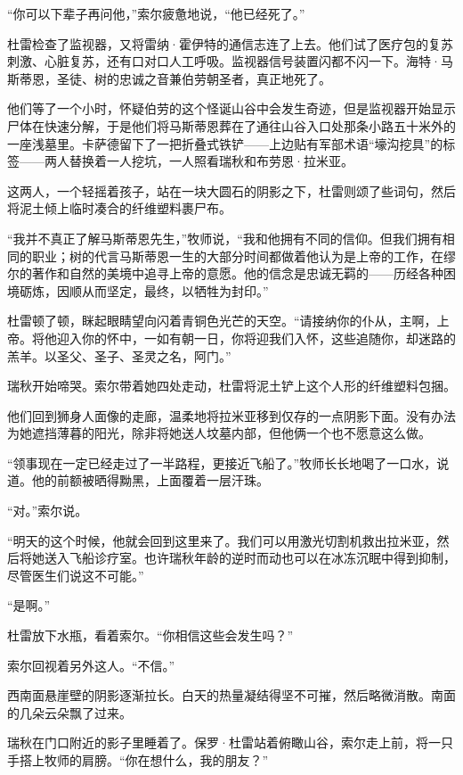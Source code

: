 \documentclass[AutoFakeBold=true]{book}
\begin{document}
``你可以下辈子再问他，''索尔疲惫地说，``他已经死了。''

杜雷检查了监视器，又将雷纳·霍伊特的通信志连了上去。他们试了医疗包的复苏刺激、心脏复苏，还有口对口人工呼吸。监视器信号装置闪都不闪一下。海特·马斯蒂恩，圣徒、树的忠诚之音兼伯劳朝圣者，真正地死了。

\vspace*{1em}

他们等了一个小时，怀疑伯劳的这个怪诞山谷中会发生奇迹，但是监视器开始显示尸体在快速分解，于是他们将马斯蒂恩葬在了通往山谷入口处那条小路五十米外的一座浅墓里。卡萨德留下了一把折叠式铁铲——上边贴有军部术语``壕沟挖具''的标签——两人替换着一人挖坑，一人照看瑞秋和布劳恩·拉米亚。

这两人，一个轻摇着孩子，站在一块大圆石的阴影之下，杜雷则颂了些词句，然后将泥土倾上临时凑合的纤维塑料裹尸布。

``我并不真正了解马斯蒂恩先生，''牧师说，``我和他拥有不同的信仰。但我们拥有相同的职业；树的代言马斯蒂恩一生的大部分时间都做着他认为是上帝的工作，在缪尔的著作和自然的美境中追寻上帝的意愿。他的信念是忠诚无羁的——历经各种困境砺炼，因顺从而坚定，最终，以牺牲为封印。''

杜雷顿了顿，眯起眼睛望向闪着青铜色光芒的天空。``请接纳你的仆从，主啊，上帝。将他迎入你的怀中，一如有朝一日，你将迎我们入怀，这些追随你，却迷路的羔羊。以圣父、圣子、圣灵之名，阿门。''

瑞秋开始啼哭。索尔带着她四处走动，杜雷将泥土铲上这个人形的纤维塑料包捆。

他们回到狮身人面像的走廊，温柔地将拉米亚移到仅存的一点阴影下面。没有办法为她遮挡薄暮的阳光，除非将她送人坟墓内部，但他俩一个也不愿意这么做。

``领事现在一定已经走过了一半路程，更接近飞船了。''牧师长长地喝了一口水，说道。他的前额被晒得黝黑，上面覆着一层汗珠。

``对。''索尔说。

``明天的这个时候，他就会回到这里来了。我们可以用激光切割机救出拉米亚，然后将她送入飞船诊疗室。也许瑞秋年龄的逆时而动也可以在冰冻沉眠中得到抑制，尽管医生们说这不可能。''

``是啊。''

杜雷放下水瓶，看着索尔。``你相信这些会发生吗？''

索尔回视着另外这人。``不信。''

\vspace*{1em}

西南面悬崖壁的阴影逐渐拉长。白天的热量凝结得坚不可摧，然后略微消散。南面的几朵云朵飘了过来。

瑞秋在门口附近的影子里睡着了。保罗·杜雷站着俯瞰山谷，索尔走上前，将一只手搭上牧师的肩膀。``你在想什么，我的朋友？''
\end{document}
